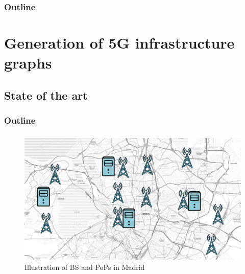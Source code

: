 \documentclass[aspectratio=169]{beamer}
\begin{document}
\begin{frame}
    \frametitle{Outline}
\end{frame}



\section{Generation of 5G infrastructure graphs}
\subsection{State of the art}
\begin{frame}
    \frametitle{Outline}
    \tableofcontents[subsectionstyle=show/shaded/hide,sectionstyle=show/shaded]
\end{frame}


\begin{frame}
    \frametitle{\secname}
    \framesubtitle{\subsecname}

    \begin{figure}
        \centering
        \includegraphics[width=.8\textwidth]{img/pop-and-antennas-no-labels.pdf}
        \caption{Illustration of BS and PoPs in Madrid }
        \label{fig:bs-pops-no-label}
    \end{figure}
\end{frame}
\end{document}
